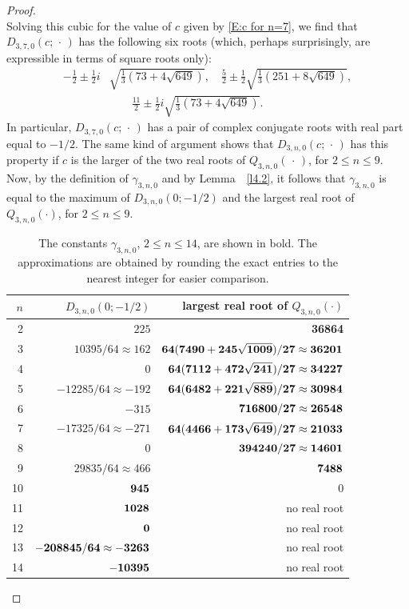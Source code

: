 \documentclass[reqno,11pt,centertags]{amsart}
\newcommand{\<}{\langle}
\renewcommand{\>}{\rangle}
\newcommand{\lb}{\label}
\newcommand{\dott}{\,\cdot\,}
\numberwithin{equation}{section}
\theoremstyle{definition}
\begin{document}
\begin{proof}
\begin{equation}
\end{equation}
Solving this cubic for the value of $c$ given by \eqref{E:c for n=7}, we find that $D_{3,7,0}(c;\dott)$ has the following six roots (which, perhaps surprisingly, are expressible in terms of square roots only):
\[
\begin{split}
 -\frac{1}{2} \pm \frac{1}{2} i &\sqrt{\frac{1}{3} \left(73 + 4 \sqrt{649}\right)}, \quad 
  \frac{5}{2} \pm \frac{1}{2} \sqrt{\frac{1}{3} \left(251 + 8 \sqrt{649}\right)}, \\
&\qquad \frac{11}{2} \pm \frac{1}{2} i \sqrt{\frac{1}{3} \left(73 + 4 \sqrt{649}\right)}.
\end{split}
\]
In particular, $D_{3,7,0}(c;\dott)$ has a pair of complex conjugate roots with real part equal to $-1/2$.  
The same kind of argument shows that $D_{3,n,0}(c;\dott)$ has this property if $c$ is the larger of the two real roots of $Q_{3,n,0}(\dott)$, for $2 \leq n \leq 9$.
Now, by  the definition of  $\gamma_{3,n,0}$ and by Lemma~~\ref{l4.2},  it follows that $\gamma_{3,n,0}$ is equal to the maximum of $D_{3,n,0}(0;-1/2)$  
and the largest real  root of $Q_{3,n,0}(\cdot)$, for $2\leq n \leq 9$. 

\begin{table}[h]
\begin{tabular}{r |r | r}
$n$ & $D_{3,n,0}(0;-1/2)$  & largest real  root of $Q_{3,n,0}(\cdot)$ 
\\[2pt]
\hline
\rule{0pt}{2.5ex}
2 & $225$   & {\bf 36864} \\
3 & $10395/64 \approx 162$ & $ {\bf64(7490 + 245\sqrt{1009})/27 \approx 36201}$ \\
4& $0$ & $ {\bf 64(7112 + 472\sqrt{241})/27 \approx 34227}$ \\
5 & $-12285/64 \approx -192$ & $ {\bf64(6482 + 221\sqrt{889})/27 \approx 30984}$ \\
6 & $-315 $ & ${\bf716800/27 \approx  26548}$ \\
7 & $-17325/64 \approx -271$ & ${\bf 64(4466 + 173\sqrt{649})/27 \approx  21033}$ \\
8 & $0$ &  ${\bf 394240/27\approx 14601}$ \\
9 & $29835/64 \approx 466$ & ${\bf 7488}$ \\
10 & ${\bf 945} $ & $0$ \\
11 & ${\bf 1028}$  & no real root\\
12 & ${\bf 0}$& no real root\\
13 & ${\bf -208845/64 \approx  -3263}$& no real root\\
14 & $ {\bf -10395}$& no real root\\
\end{tabular}
\caption{The constants $\gamma_{3,n,0}$,  $2 \leq n \leq 14$, are shown in bold. The approximations are obtained by rounding the exact entries to the nearest integer for easier comparison.}  
\lb{T:gamma3n0} 
\end{table}


\end{proof}
\end{document}
